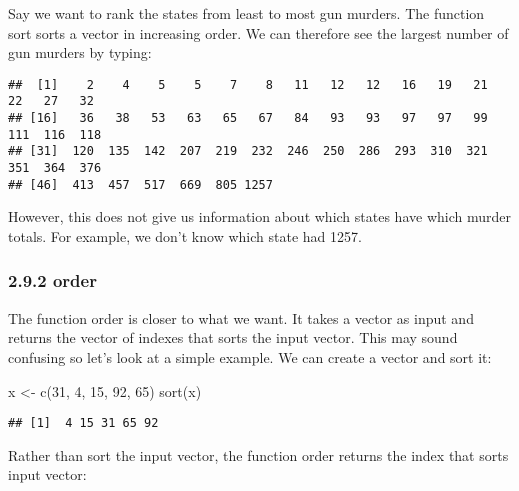 \documentclass[
]{article}
\newenvironment{Shaded}{\begin{snugshade}}{\end{snugshade}}
\newcommand{\DecValTok}[1]{\textcolor[rgb]{0.00,0.00,0.81}{#1}}
\newcommand{\FunctionTok}[1]{\textcolor[rgb]{0.00,0.00,0.00}{#1}}
\newcommand{\NormalTok}[1]{#1}
\newcommand{\OtherTok}[1]{\textcolor[rgb]{0.56,0.35,0.01}{#1}}
\newcommand{\SpecialCharTok}[1]{\textcolor[rgb]{0.00,0.00,0.00}{#1}}
\begin{document}
Say we want to rank the states from least to most gun murders. The
function sort sorts a vector in increasing order. We can therefore see
the largest number of gun murders by typing:

\begin{Shaded}
\end{Shaded}

\begin{verbatim}
##  [1]    2    4    5    5    7    8   11   12   12   16   19   21   22   27   32
## [16]   36   38   53   63   65   67   84   93   93   97   97   99  111  116  118
## [31]  120  135  142  207  219  232  246  250  286  293  310  321  351  364  376
## [46]  413  457  517  669  805 1257
\end{verbatim}

However, this does not give us information about which states have which
murder totals. For example, we don't know which state had 1257.

\hypertarget{order}{%
\subsubsection{2.9.2 order}\label{order}}

The function order is closer to what we want. It takes a vector as input
and returns the vector of indexes that sorts the input vector. This may
sound confusing so let's look at a simple example. We can create a
vector and sort it:

\begin{Shaded}
\begin{Highlighting}[]
\NormalTok{x }\OtherTok{\textless{}{-}} \FunctionTok{c}\NormalTok{(}\DecValTok{31}\NormalTok{, }\DecValTok{4}\NormalTok{, }\DecValTok{15}\NormalTok{, }\DecValTok{92}\NormalTok{, }\DecValTok{65}\NormalTok{)}
\FunctionTok{sort}\NormalTok{(x)}
\end{Highlighting}
\end{Shaded}

\begin{verbatim}
## [1]  4 15 31 65 92
\end{verbatim}

Rather than sort the input vector, the function order returns the index
that sorts input vector:
\end{document}
